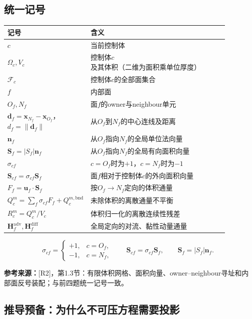 \documentclass[UTF8,12pt,a4paper]{ctexart}
\numberwithin{equation}{section}
\newcommand{\Rtwo}{\textnormal{[R2]}}
\newcommand{\source}[1]{\par\smallskip\noindent\colorbox{sourcebg}{%
  \parbox{0.955\linewidth}{\footnotesize\color{sourcegray}\textbf{参考来源：}#1}}\par\smallskip}
\begin{document}
\subsection*{统一记号}
\begin{longtable}{>{\centering\arraybackslash}p{0.21\linewidth}p{0.68\linewidth}}
\toprule
记号 & 含义\\
\midrule
$c$ & 当前控制体\\
$\Omega_c,V_c$ & 控制体$c$及其体积（二维为面积乘单位厚度）\\
$\mathcal F_c$ & 控制体$c$的全部面集合\\
$f$ & 内部面\\
$O_f,N_f$ & 面$f$的owner与neighbour单元\\
$\bm d_f=\bm x_{N_f}-\bm x_{O_f}$，$d_f=\lVert\bm d_f\rVert$ & 从$O_f$到$N_f$的中心连线及距离\\
$\bm n_f$ & 从$O_f$指向$N_f$的全局单位法向量\\
$\bm S_f=|S_f|\bm n_f$ & 从$O_f$指向$N_f$的全局有向面积向量\\
$\sigma_{cf}$ & $c=O_f$时为$+1$，$c=N_f$时为$-1$\\
$\bm S_{cf}=\sigma_{cf}\bm S_f$ & 面$f$相对于控制体$c$的外向面积向量\\
$F_f=\bm u_f\cdot\bm S_f$ & 按$O_f\to N_f$定向的体积通量\\
$Q_c^m=\sum_f\sigma_{cf}F_f+Q_c^{m,\mathrm{bnd}}$ & 未除体积的离散通量不平衡\\
$R_c^m=Q_c^m/V_c$ & 体积归一化的离散连续性残差\\
$\bm H_f^{\mathrm{adv}},\bm H_f^{\mathrm{diff}}$ & 全局定向的对流、黏性动量通量\\
\bottomrule
\end{longtable}
\begin{equation}
  \boxed{\sigma_{cf}=\begin{cases}+1,&c=O_f,\\-1,&c=N_f,\end{cases}
  \qquad\bm S_{cf}=\sigma_{cf}\bm S_f,\qquad\bm S_f=|S_f|\bm n_f.}
  \label{eq:orientation}
\end{equation}
\source{\Rtwo，第1.3节：有限体积网格、面积向量、owner--neighbour寻址和内部面反号装配；与前四题统一记号一致。}

\subsection*{推导预备：为什么不可压方程需要投影}
\end{document}
